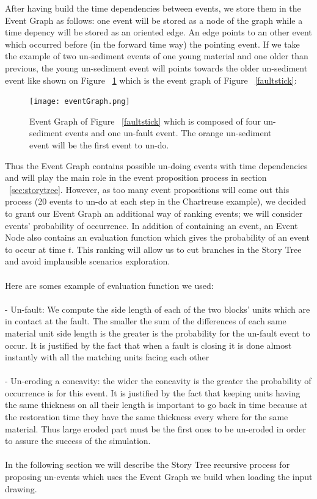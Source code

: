 \documentclass[12pt, a4paper]{report} %
\begin{document}
After having build the time dependencies between events, we store them in the Event Graph as follows:
one event will be stored as a node of the graph while a time depency will be stored as an oriented edge. An edge points to an other event which occurred before (in the forward time way) the pointing event. If we take the example of two un-sediment events of one young material and one older than previous, the young un-sediment event will points towards the older un-sediment event like shown on Figure ~\ref{eventGraph} which is the event graph of Figure ~\ref{faultstick}:

	\begin{figure}[H]
	\centering
	\texttt{[image: eventGraph.png]}
	\caption{ Event Graph of Figure ~\ref{faultstick} which is composed of four un-sediment events and one un-fault event. The orange un-sediment event will be the first event to un-do.}
	\label{eventGraph}
	\end{figure}

Thus the Event Graph contains possible un-doing events with time dependencies and will play the main role in the event proposition process in section ~\ref{sec:storytree}. However, as too many event propositions will come out this process (20 events to un-do at each step in the Chartreuse example), we decided to grant our Event Graph an additional way of ranking events; we will consider events' probability of occurrence. In addition of containing an event, an Event Node also contains an evaluation function which gives the probability of an event to occur at time $t$. This ranking will allow us to cut branches in the Story Tree and avoid implausible scenarios exploration.
\\\\
Here are somes example of evaluation function we used:
\\\\
 - Un-fault: We compute the side length of each of the two blocks' units which are in contact at the fault. The smaller the sum of the differences of each same material unit side length is the greater is the probability for the un-fault event to occur. It is justified by the fact that when a fault is closing it is done almost instantly with all the matching units facing each other\\\\
 
 - Un-eroding a concavity: the wider the concavity is the greater the probability of occurrence is for this event. It is justified by the fact that keeping units having the same thickness on all their length is important to go back in time because at the restoration time they have the same thickness every where for the same material. Thus large eroded part must be the first ones to be un-eroded in order to assure the success of the simulation.\\\\
In the following section we will describe the Story Tree recursive process for proposing un-events which uses the Event Graph we build when loading the input drawing.
\end{document}
